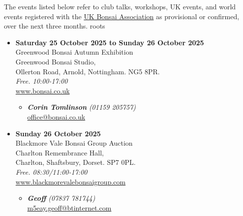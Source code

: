 \label{2025-10-events}
\noindent
The events listed below refer to club talks, workshops, UK events, and world events registered with the \href{https://www.ukbonsaiassoc.org/events.html}{UK Bonsai Association} as provisional or confirmed, over the next three months.
roots
\begin{itemize}


    \item \textbf{Saturday 25 October 2025 to Sunday 26 October 2025}
    \\
    Greenwood Bonsai Autumn Exhibition \\
    Greenwood Bonsai Studio, \\
    Ollerton Road, Arnold, Nottingham. NG5 8PR.
    \\
    \emph{Free. 10:00-17:00}
    \\
    \href{https://www.bonsai.co.uk}{www.bonsai.co.uk}
    \begin{itemize}
        \item \textbf{\emph{Corin Tomlinson}} \emph{(01159 205757)} \\
        \href{mailto:office@bonsai.co.uk}{office@bonsai.co.uk} 
    \end{itemize}

    \item \textbf{Sunday 26 October 2025}
    \\
    Blackmore Vale Bonsai Group Auction \\
    Charlton Remembrance Hall, \\
    Charlton, Shaftsbury, Dorset. SP7 0PL.
    \\
    \emph{Free. 08:30/11:00-17:00}
    \\
    \href{https://www.blackmorevalebonsaigroup.com}{www.blackmorevalebonsaigroup.com}
    \begin{itemize}
        \item \textbf{\emph{Geoff}} \emph{(07837 781744)} \\
        \href{mailto:m5eay.geoff@btinternet.com}{m5eay.geoff@btinternet.com} 
    \end{itemize}


\end{itemize}
